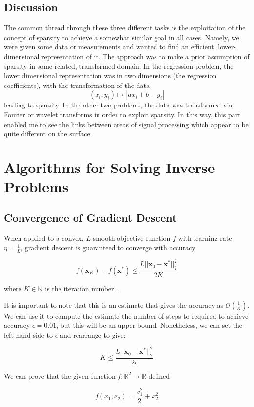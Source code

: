 \documentclass[12pt]{article}
\begin{document}
\subsection{Discussion}

The common thread through these three different tasks is the exploitation of the concept of sparsity to achieve a somewhat similar goal in all cases.
Namely, we were given some data or measurements and wanted to find an efficient, lower-dimensional representation of it.
The approach was to make a prior assumption of sparsity in some related, transformed domain.
In the regression problem, the lower dimensional representation was in two dimensions (the regression coefficients),
with the transformation of the data
\[(x_i,y_i)\mapsto |ax_i+b-y_i|\]
leading to sparsity. In the other two problems, the data was transformed via Fourier or wavelet transforms in order to exploit sparsity.
In this way, this part enabled me to see the links between areas of signal processing which appear to be quite different on the surface.

\section{Algorithms for Solving Inverse Problems}
\subsection{Convergence of Gradient Descent}

When applied to a convex, $L$-smooth objective function $f$ with learning rate $\eta=\frac{1}{L}$,
gradient descent is guaranteed to converge with accuracy

\[f(\bm{x}_K) - f(\bm{x}^*) \leq \frac{L||\bm{x}_0-\bm{x}^*||_2^2}{2K}\]

where $K\in\mathbb{N}$ is the iteration number \cite{garrigos2024handbook}.

It is important to note that this is an estimate that gives the accuracy as $\mathcal{O}(\frac{1}{K})$.
We can use it to compute the estimate the number of steps to required to achieve accuracy $\epsilon=0.01$,
but this will be an upper bound.
Nonetheless, we can set the left-hand side to $\epsilon$ and rearrange to give:

\[K \leq \frac{L||\bm{x}_0-\bm{x}^*||_2^2}{2\epsilon}\]

We can prove that the given function $f:\mathbb{R}^2\rightarrow\mathbb{R}$ defined

\[f(x_1,x_2) = \frac{x_1^2}{2} + x_2^2\]
\end{document}
